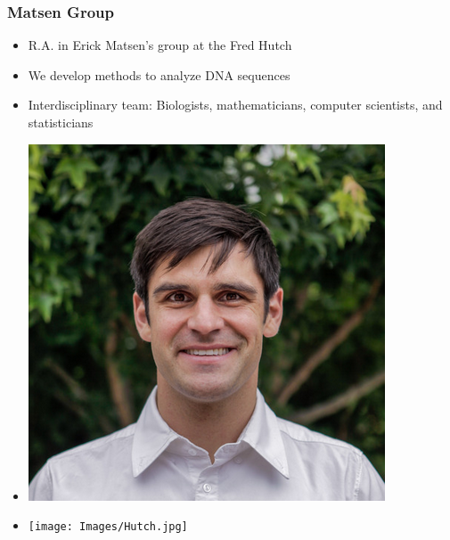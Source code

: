\documentclass[mathserif,compress]{beamer}
\renewcommand\;{\,}
\begin{document}
\begin{frame}\frametitle{Matsen Group}
\begin{minipage}{0.49\linewidth}
\begin{itemize}
\bigskip
\item R.A. in Erick Matsen's group at the Fred Hutch
\bigskip
\item We develop methods to analyze DNA sequences
\bigskip
\item Interdisciplinary team: Biologists, mathematicians, computer scientists, and statisticians
\end{itemize}
\end{minipage}
\begin{minipage}{0.49\linewidth}
\begin{itemize}
\item[]
\begin{center}
\includegraphics[width=0.8\linewidth]{Images/Erick.png}
\end{center}
\item[]
\begin{center}
\texttt{[image: Images/Hutch.jpg]}
\end{center}
\end{itemize}
\end{minipage}
\end{frame}
\end{document}
